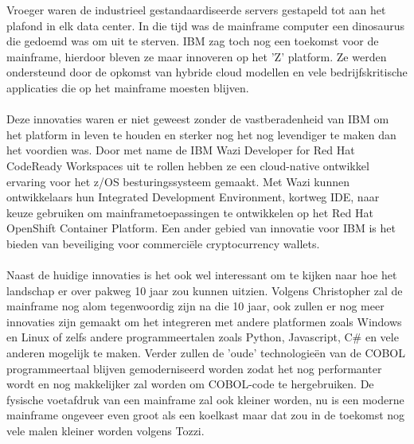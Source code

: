Vroeger waren de industrieel gestandaardiseerde servers gestapeld tot aan het plafond in elk data center. In die tijd was de mainframe computer een dinosaurus die gedoemd was om uit te sterven. IBM zag toch nog een toekomst voor de mainframe, hierdoor bleven ze maar innoveren op het 'Z' platform. Ze werden ondersteund door de opkomst van hybride cloud modellen en vele bedrijfskritische applicaties die op het mainframe moesten blijven. \autocite{Moorhead2022}
\\ \\
Deze innovaties waren er niet geweest zonder de vastberadenheid van IBM om het platform in leven te houden en sterker nog het nog levendiger te maken dan het voordien was. Door met name de IBM Wazi Developer for Red Hat CodeReady Workspaces uit te rollen hebben ze een cloud-native ontwikkel ervaring voor het z/OS besturingssysteem gemaakt. Met Wazi kunnen ontwikkelaars hun Integrated Development Environment, kortweg IDE, naar keuze gebruiken om mainframetoepassingen te ontwikkelen op het Red Hat OpenShift Container Platform. Een ander gebied van innovatie voor IBM is het bieden van beveiliging voor commerciële cryptocurrency wallets. \autocite{Bloomberg2021}
\\ \\
Naast de huidige innovaties is het ook wel interessant om te kijken naar hoe het landschap er over pakweg 10 jaar zou kunnen uitzien. Volgens Christopher \textcite{Tozzi2022} zal de mainframe nog alom tegenwoordig zijn na die 10 jaar, ook zullen er nog meer innovaties zijn gemaakt om het integreren met andere platformen zoals Windows en Linux of zelfs andere programmeertalen zoals Python, Javascript, C\# en vele anderen mogelijk te maken. Verder zullen de 'oude' technologieën van de COBOL programmeertaal blijven gemoderniseerd worden zodat het nog performanter wordt en nog makkelijker zal worden om COBOL-code te hergebruiken. De fysische voetafdruk van een mainframe zal ook kleiner worden, nu is een moderne mainframe ongeveer even groot als een koelkast maar dat zou in de toekomst nog vele malen kleiner worden volgens Tozzi.

